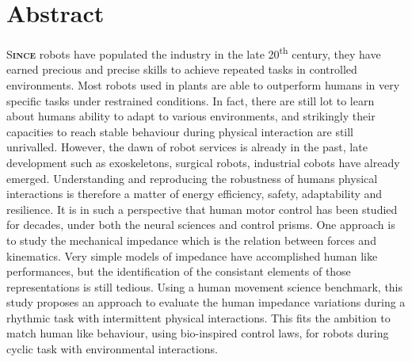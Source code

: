 \documentclass[12pt, a4paper]{article} %
\numberwithin{equation}{section}
\begin{document}
\section*{Abstract}
\vspace{15pt}
\lettrine{S}{\textbf{ince}} robots have populated the industry in the late 20\textsuperscript{th} century, they have earned precious and precise skills to achieve repeated tasks in controlled environments. Most robots used in plants are able to outperform humans in very specific tasks under restrained conditions. In fact, there are still lot to learn about humans ability to adapt to various environments, and strikingly their capacities to reach stable behaviour during physical interaction are still unrivalled. However, the dawn of robot services is already in the past, late development such as exoskeletons, surgical robots, industrial cobots have already emerged. Understanding and reproducing the robustness of humans physical interactions is therefore a matter of energy efficiency, safety, adaptability and resilience. %
%
\newlineBlank
%
It is in such a perspective that human motor control has been studied for decades, under both the neural sciences and control prisms. One approach is to study the mechanical impedance which is the relation between forces and kinematics. Very simple models of impedance have accomplished human like performances, but the identification of the consistant elements of those representations is still tedious. %
%
\newlineBlank
%
Using a human movement science benchmark, this study proposes an approach to evaluate the human impedance variations during a rhythmic task with intermittent physical interactions. This fits the ambition to match human like behaviour, using bio-inspired control laws, for robots during cyclic task with environmental interactions.

\vfill
\hspace{0pt}
%
\newpage %
\hspace{0pt} %
\vfill %
%
\end{document}
